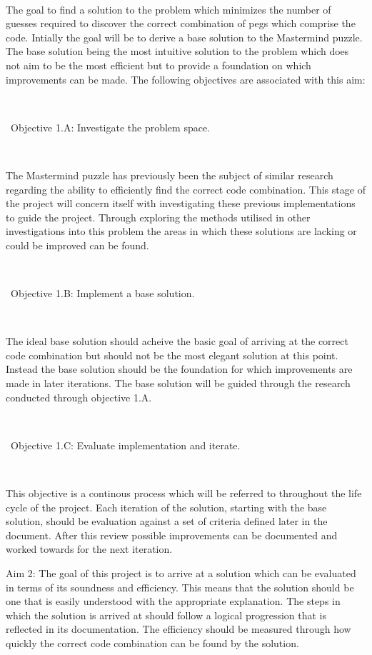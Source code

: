\documentclass[12pt]{article}  %
\theoremstyle{definition}
\theoremstyle{remark}
\begin{document}
\

 The goal to find a solution to the problem which minimizes the number of guesses required to discover the correct combination of pegs which comprise the code. Intially the goal will be to derive a base solution to the Mastermind puzzle. The base solution being the most intuitive solution to the problem which does not aim to be the most efficient but to provide a foundation on which improvements can be made. The following objectives are associated with this aim:

\

\textbullet\ Objective 1.A: Investigate the problem space.

\

The Mastermind puzzle has previously been the subject of similar research regarding the ability to efficiently find the correct code combination. This stage of the project will concern itself with investigating these previous implementations to guide the project. Through exploring the methods utilised in other investigations into this problem the areas in which these solutions are lacking or could be improved can be found.

\

\textbullet\ Objective 1.B:  Implement a base solution.

\

The ideal base solution should acheive the basic goal of arriving at the correct code combination but should not be the most elegant solution at this point. Instead the base solution should be the foundation for which improvements are made in later iterations. The base solution will be guided through the research conducted through objective 1.A.

\

\textbullet\ Objective 1.C: Evaluate implementation and iterate.

\

This objective is a continous process which will be referred to throughout the life cycle of the project. Each iteration of the solution, starting with the base solution, should be evaluation against a set of criteria defined later in the document. After this review possible improvements can be documented and worked towards for the next iteration.


{Aim 2: The goal of this project is to arrive at a solution which can be evaluated in terms of its soundness and efficiency. This means that the solution should be one that is easily understood with the appropriate explanation. The steps in which the solution is arrived at should follow a logical progression that is reflected in its documentation. The efficiency should be measured through how quickly the correct code combination can be found by the solution.}
\end{document}
